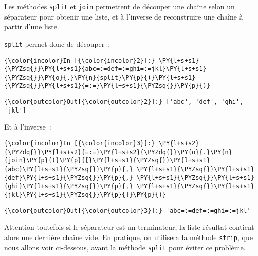     Les méthodes \texttt{split} et \texttt{join} permettent de découper une
chaîne selon un séparateur pour obtenir une liste, et à l'inverse de
reconstruire une chaîne à partir d'une liste.

    \texttt{split} permet donc de découper~:

    \begin{Verbatim}[commandchars=\\\{\},frame=single,framerule=0.3mm,rulecolor=\color{cellframecolor}]
{\color{incolor}In [{\color{incolor}2}]:} \PY{l+s+s1}{\PYZsq{}}\PY{l+s+s1}{abc=:=def=:=ghi=:=jkl}\PY{l+s+s1}{\PYZsq{}}\PY{o}{.}\PY{n}{split}\PY{p}{(}\PY{l+s+s1}{\PYZsq{}}\PY{l+s+s1}{=:=}\PY{l+s+s1}{\PYZsq{}}\PY{p}{)}
\end{Verbatim}


\begin{Verbatim}[commandchars=\\\{\},frame=single,framerule=0.3mm,rulecolor=\color{cellframecolor}]
{\color{outcolor}Out[{\color{outcolor}2}]:} ['abc', 'def', 'ghi', 'jkl']
\end{Verbatim}
            
    Et à l'inverse~:

    \begin{Verbatim}[commandchars=\\\{\},frame=single,framerule=0.3mm,rulecolor=\color{cellframecolor}]
{\color{incolor}In [{\color{incolor}3}]:} \PY{l+s+s2}{\PYZdq{}}\PY{l+s+s2}{=:=}\PY{l+s+s2}{\PYZdq{}}\PY{o}{.}\PY{n}{join}\PY{p}{(}\PY{p}{[}\PY{l+s+s1}{\PYZsq{}}\PY{l+s+s1}{abc}\PY{l+s+s1}{\PYZsq{}}\PY{p}{,} \PY{l+s+s1}{\PYZsq{}}\PY{l+s+s1}{def}\PY{l+s+s1}{\PYZsq{}}\PY{p}{,} \PY{l+s+s1}{\PYZsq{}}\PY{l+s+s1}{ghi}\PY{l+s+s1}{\PYZsq{}}\PY{p}{,} \PY{l+s+s1}{\PYZsq{}}\PY{l+s+s1}{jkl}\PY{l+s+s1}{\PYZsq{}}\PY{p}{]}\PY{p}{)}
\end{Verbatim}


\begin{Verbatim}[commandchars=\\\{\},frame=single,framerule=0.3mm,rulecolor=\color{cellframecolor}]
{\color{outcolor}Out[{\color{outcolor}3}]:} 'abc=:=def=:=ghi=:=jkl'
\end{Verbatim}
            
    Attention toutefois si le séparateur est un terminateur, la liste
résultat contient alors une dernière chaîne vide. En pratique, on
utilisera la méthode \texttt{strip}, que nous allons voir ci-dessous,
avant la méthode \texttt{split} pour éviter ce problème.


